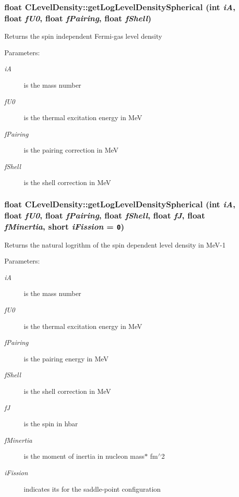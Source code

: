 \subsubsection{\setlength{\rightskip}{0pt plus 5cm}float CLevel\-Density::get\-Log\-Level\-Density\-Spherical (int {\em i\-A}, float {\em f\-U0}, float {\em f\-Pairing}, float {\em f\-Shell})}\label{classCLevelDensity_f91006c52fab6772f9a98868cf03425c}


Returns the spin independent Fermi-gas level density \begin{Desc}
\item[Parameters:]
\begin{description}
\item[{\em i\-A}]is the mass number \item[{\em f\-U0}]is the thermal excitation energy in Me\-V \item[{\em f\-Pairing}]is the pairing correction in Me\-V \item[{\em f\-Shell}]is the shell correction in Me\-V \end{description}
\end{Desc}
\subsubsection{\setlength{\rightskip}{0pt plus 5cm}float CLevel\-Density::get\-Log\-Level\-Density\-Spherical (int {\em i\-A}, float {\em f\-U0}, float {\em f\-Pairing}, float {\em f\-Shell}, float {\em f\-J}, float {\em f\-Minertia}, short {\em i\-Fission} = {\tt 0})}\label{classCLevelDensity_4bac625039f18d6d02c6a72070ae3ff3}


Returns the natural logrithm of the spin dependent level density in Me\-V-1 \begin{Desc}
\item[Parameters:]
\begin{description}
\item[{\em i\-A}]is the mass number \item[{\em f\-U0}]is the thermal excitation energy in Me\-V \item[{\em f\-Pairing}]is the pairing energy in Me\-V \item[{\em f\-Shell}]is the shell correction in Me\-V \item[{\em f\-J}]is the spin in hbar \item[{\em f\-Minertia}]is the moment of inertia in nucleon mass$\ast$ fm$^\wedge$2 \item[{\em i\-Fission}]indicates its for the saddle-point configuration \end{description}
\end{Desc}
